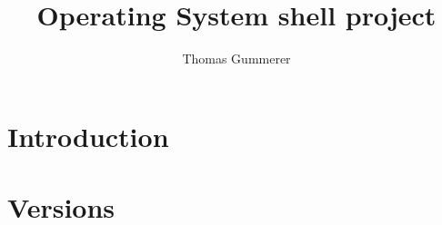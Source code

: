 \documentclass{article}
\author{Thomas Gummerer}
\title{Operating System shell project}
\begin{document}
\maketitle

\section{Introduction}


\section{Versions}

\end{document}

